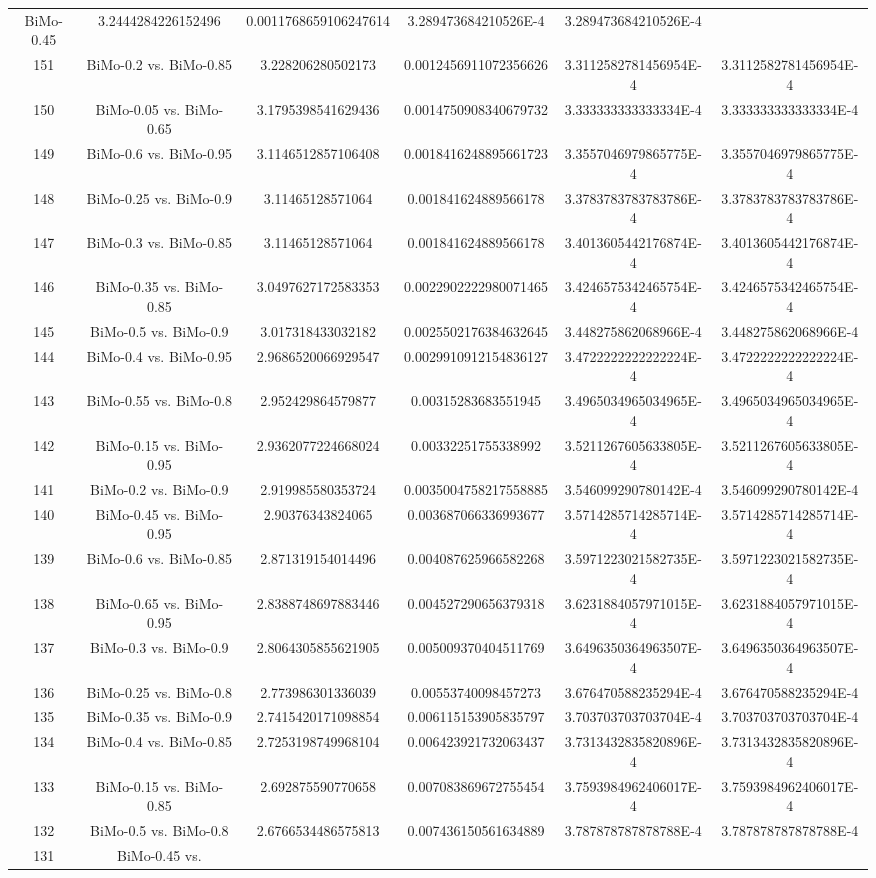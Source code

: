 \documentclass[a4paper,10pt]{article}
\begin{document}
\begin{landscape}
\begin{table}[!htp]
\begin{tabular}{cccccc}
BiMo-0.45&3.2444284226152496&0.0011768659106247614&3.289473684210526E-4&3.289473684210526E-4\\151&BiMo-0.2 vs. BiMo-0.85&3.228206280502173&0.0012456911072356626&3.3112582781456954E-4&3.3112582781456954E-4\\150&BiMo-0.05 vs. BiMo-0.65&3.1795398541629436&0.0014750908340679732&3.333333333333334E-4&3.333333333333334E-4\\149&BiMo-0.6 vs. BiMo-0.95&3.1146512857106408&0.0018416248895661723&3.3557046979865775E-4&3.3557046979865775E-4\\148&BiMo-0.25 vs. BiMo-0.9&3.11465128571064&0.001841624889566178&3.3783783783783786E-4&3.3783783783783786E-4\\147&BiMo-0.3 vs. BiMo-0.85&3.11465128571064&0.001841624889566178&3.4013605442176874E-4&3.4013605442176874E-4\\146&BiMo-0.35 vs. BiMo-0.85&3.0497627172583353&0.0022902222980071465&3.4246575342465754E-4&3.4246575342465754E-4\\145&BiMo-0.5 vs. BiMo-0.9&3.017318433032182&0.0025502176384632645&3.448275862068966E-4&3.448275862068966E-4\\144&BiMo-0.4 vs. BiMo-0.95&2.9686520066929547&0.0029910912154836127&3.4722222222222224E-4&3.4722222222222224E-4\\143&BiMo-0.55 vs. BiMo-0.8&2.952429864579877&0.00315283683551945&3.4965034965034965E-4&3.4965034965034965E-4\\142&BiMo-0.15 vs. BiMo-0.95&2.9362077224668024&0.00332251755338992&3.5211267605633805E-4&3.5211267605633805E-4\\141&BiMo-0.2 vs. BiMo-0.9&2.919985580353724&0.0035004758217558885&3.546099290780142E-4&3.546099290780142E-4\\140&BiMo-0.45 vs. BiMo-0.95&2.90376343824065&0.003687066336993677&3.5714285714285714E-4&3.5714285714285714E-4\\139&BiMo-0.6 vs. BiMo-0.85&2.871319154014496&0.004087625966582268&3.5971223021582735E-4&3.5971223021582735E-4\\138&BiMo-0.65 vs. BiMo-0.95&2.8388748697883446&0.004527290656379318&3.6231884057971015E-4&3.6231884057971015E-4\\137&BiMo-0.3 vs. BiMo-0.9&2.8064305855621905&0.005009370404511769&3.6496350364963507E-4&3.6496350364963507E-4\\136&BiMo-0.25 vs. BiMo-0.8&2.773986301336039&0.00553740098457273&3.676470588235294E-4&3.676470588235294E-4\\135&BiMo-0.35 vs. BiMo-0.9&2.7415420171098854&0.006115153905835797&3.703703703703704E-4&3.703703703703704E-4\\134&BiMo-0.4 vs. BiMo-0.85&2.7253198749968104&0.006423921732063437&3.7313432835820896E-4&3.7313432835820896E-4\\133&BiMo-0.15 vs. BiMo-0.85&2.692875590770658&0.007083869672755454&3.7593984962406017E-4&3.7593984962406017E-4\\132&BiMo-0.5 vs. BiMo-0.8&2.6766534486575813&0.007436150561634889&3.787878787878788E-4&3.787878787878788E-4\\131&BiMo-0.45 vs. 
\end{tabular}
\end{table}
\end{landscape}
\end{document}
